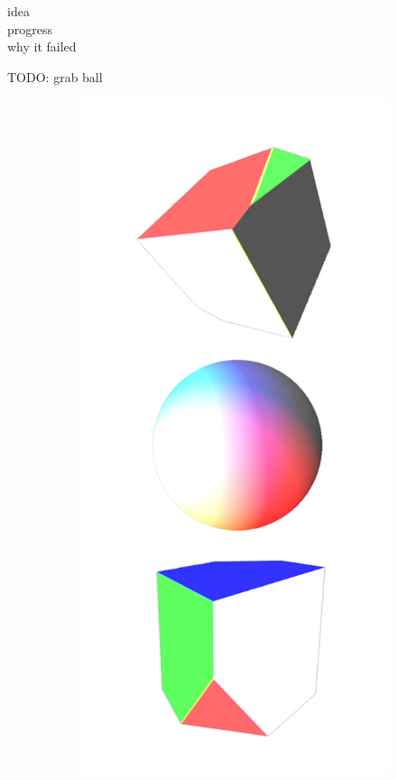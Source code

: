 \documentclass{l4proj}
\begin{document}
idea\\
progress\\
why it failed

TODO: grab ball

\begin{figure}[H]
  \begin{subfigure}[b]{0.25\textwidth}
    \includegraphics[width=\textwidth]{images/textures/no-pattern-rgbw.png}

\end{subfigure}
\end{figure}
\end{document}
